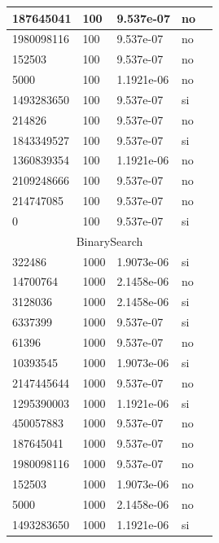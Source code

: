 \documentclass[12pt, fleqn]{article}                             %
\theoremstyle{break}                                            %
\begin{document}
\begin{longtable}{|m{5em}|m{5em}|m{10em}|m{5em}|@{}m{0pt}@{}}
            187645041& 100  & 9.537e-07 & no &\\[1em]    \hline
            1980098116& 100  & 9.537e-07 & no &\\[1em]    \hline
            152503& 100  & 9.537e-07 & no &\\[1em]    \hline
            5000& 100  & 1.1921e-06 & no &\\[1em]    \hline
            1493283650& 100  & 9.537e-07 & si &\\[1em]    \hline
            214826& 100  & 9.537e-07 & no &\\[1em]    \hline
            1843349527& 100  & 9.537e-07 & si &\\[1em]    \hline
            1360839354& 100  & 1.1921e-06 & no &\\[1em]    \hline
            2109248666& 100  & 9.537e-07 & no &\\[1em]    \hline
            214747085& 100  & 9.537e-07 & no &\\[1em]    \hline
            0& 100  & 9.537e-07 & si &\\[1em]    \hline
            \multicolumn{5}{|c|}{BinarySearch}   \\          \hline
            322486& 1000  & 1.9073e-06 & si &\\[1em]    \hline
            14700764& 1000  & 2.1458e-06 & no &\\[1em]    \hline
            3128036& 1000  & 2.1458e-06 & si &\\[1em]    \hline
            6337399& 1000  & 9.537e-07 & si &\\[1em]    \hline
            61396& 1000  & 9.537e-07 & no &\\[1em]    \hline
            10393545& 1000  & 1.9073e-06 & si &\\[1em]    \hline
            2147445644& 1000  & 9.537e-07 & no &\\[1em]    \hline
            1295390003& 1000  & 1.1921e-06 & si &\\[1em]    \hline
            450057883& 1000  & 9.537e-07 & no &\\[1em]    \hline
            187645041& 1000  & 9.537e-07 & no &\\[1em]    \hline
            1980098116& 1000  & 9.537e-07 & no &\\[1em]    \hline
            152503& 1000  & 1.9073e-06 & no &\\[1em]    \hline
            5000& 1000  & 2.1458e-06 & no &\\[1em]    \hline
            1493283650& 1000  & 1.1921e-06 & si &\\[1em]    \hline

\end{longtable}
\end{document}
